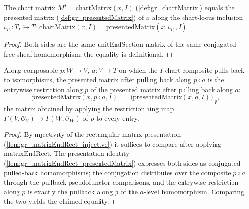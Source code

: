 \begin{lemma}
  \label{lem:gr_chartMatrix_eq_presentedMatrix}
  The chart matrix \(M^I = \mathrm{chartMatrix}(x, I)\) (\cref{def:gr_chartMatrix}) equals
  the presented matrix (\cref{def:gr_presentedMatrix}) of \(x\) along the chart-locus
  inclusion \(\iota_{T_I} : T_I \hookrightarrow T\):
  \(\mathrm{chartMatrix}(x, I) = \mathrm{presentedMatrix}(x, \iota_{T_I}, I)\).
\end{lemma}
\begin{proof}
  Both sides are the same \(\mathrm{unitEndSection}\)-matrix of the same conjugated
  free-sheaf homomorphism; the equality is definitional.
\end{proof}

\begin{lemma}
  \label{lem:gr_presentedMatrix_comp}
  Along composable \(p : W \to V\), \(a : V \to T\) on which the \(I\)-chart composite
  pulls back to isomorphisms, the presented matrix after pulling back along \(p \circ a\)
  is the entrywise restriction along \(p\) of the presented matrix after pulling back
  along \(a\):
  \[
    \mathrm{presentedMatrix}(x, p \circ a, I)
      \;=\; \bigl(\mathrm{presentedMatrix}(x, a, I)\bigr)\big|_{p},
  \]
  the matrix obtained by applying the restriction ring map \(\Gamma(V, \mathcal{O}_V) \to
  \Gamma(W, \mathcal{O}_W)\) of \(p\) to every entry.
\end{lemma}
\begin{proof}
  By injectivity of the rectangular matrix presentation
  (\cref{lem:gr_matrixEndRect_injective}) it suffices to compare after applying
  \(\mathrm{matrixEndRect}\). The presentation identity
  (\cref{lem:gr_matrixEndRect_presentedMatrix}) expresses both sides as conjugated
  pulled-back homomorphisms; the conjugation distributes over the composite \(p \circ a\)
  through the pullback pseudofunctor comparisons, and the entrywise restriction along
  \(p\) is exactly the pullback along \(p\) of the \(a\)-level homomorphism. Comparing the
  two yields the claimed equality.
\end{proof}

